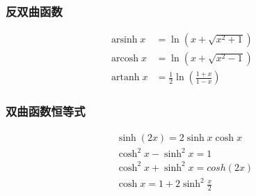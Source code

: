 \subsubsection{反双曲函数}
\begin{align}
    \operatorname{arsinh}{x}&=\ln(x+\sqrt{x^2+1})\\
    \operatorname{arcosh}{x}&=\ln(x+\sqrt{x^2-1})\\
    \operatorname{artanh}{x}&=\frac{1}{2}\ln(\frac{1+x}{1-x})
\end{align}

\subsubsection{双曲函数恒等式}
\begin{align}
&\sinh (2x) = 2\sinh x\cosh x \label{eq:hyperbolic_functions_1} \\
&\cosh^2x-\sinh^2x = 1 \label{eq:hyperbolic_functions_2} \\
&\cosh^2x+\sinh^2x = cosh (2x) \label{eq:hyperbolic_functions_3} \\
&\cosh x = 1+2\sinh^2\frac{x}{2} \label{eq:hyperbolic_functions_4}
\end{align}
